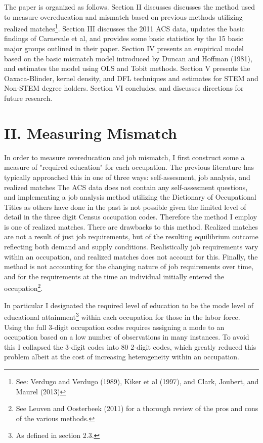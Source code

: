 \documentclass[11pt]{article}
\theoremstyle{definition}
\begin{document}
\vspace{2mm}
The paper is organized as follows.  Section II discusses discusses the method used to measure overeducation and mismatch based on previous methods utilizing realized matches\footnote{See: Verdugo and Verdugo (1989), Kiker et al (1997), and Clark, Joubert, and Maurel (2013)}. Section III discusses the 2011 ACS data, updates the basic findings of Carnevale et al, and provides some basic statistics by the 15 basic major groups outlined in their paper. Section IV presents an empirical model based on the basic mismatch model introduced by Duncan and Hoffman (1981), and estimates the model using OLS and Tobit methods.  Section V presents the Oaxaca-Blinder, kernel density, and DFL techniques and estimates for STEM and Non-STEM degree holders.  Section VI concludes, and discusses directions for future research.

\vspace{2mm}

\section*{ II. Measuring Mismatch}

\normalsize
\vspace{1.5 mm}
\indent
\par
In order to measure overeducation and job mismatch, I first construct some a measure of "required education" for each occupation.  The previous literature has typically approached this in one of three ways: self-assesment, job analysis, and realized matches The ACS data does not contain any self-assesment questions, and implementing a job analysis method utilizing the Dictionary of Occupational Titles as others have done in the past is not possible given the limited level of detail in the three digit Census occupation codes.  Therefore the method I employ is one of realized matches.  There are drawbacks to this method. Realized matches are not a result of just job requirements, but of the resulting equilibrium outcome reflecting both demand and supply conditions.  Realistically job requirements vary within an occupation, and realized matches does not account for this.  Finally, the method is not accounting for the changing nature of job requirements over time, and for the requirements at the time an individual initially entered the occupation\footnote{See Leuven and Oosterbeek (2011) for a thorough review of the pros and cons of the various methods.}.

\vspace{2mm}
In particular I designated the required level of education to be the mode level of educational attainment\footnote{As defined in section 2.3.} within each occupation for those in the labor force.  Using the full 3-digit occupation codes requires assigning a mode to an occupation based on a low number of observations in many instances.  To avoid this I collapsed the 3-digit codes into 80 2-digit codes, which greatly reduced this problem albeit at the cost of increasing heterogeneity within an occupation.
\end{document}
